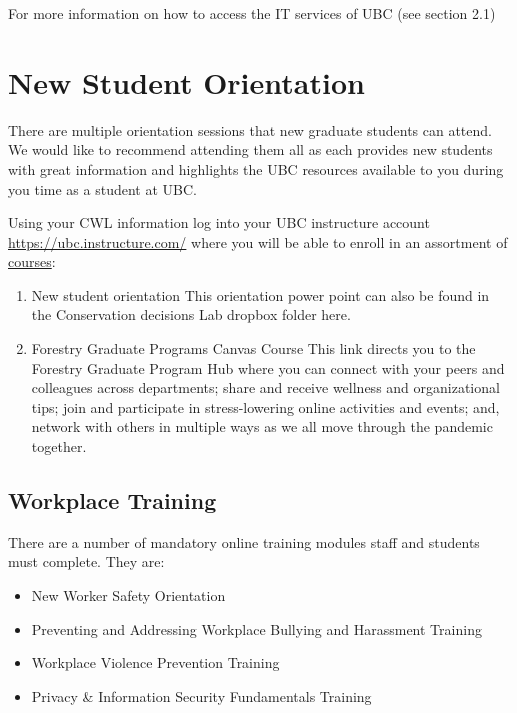 \documentclass[
]{book}
\providecommand{\tightlist}{%
  \setlength{\itemsep}{0pt}\setlength{\parskip}{0pt}}
\begin{document}
For more information on how to access the IT services of UBC (see section 2.1)

\hypertarget{orientation}{%
\chapter*{New Student Orientation}\label{orientation}}

There are multiple orientation sessions that new graduate students can attend. We would like to recommend attending them all as each provides new students with great information and highlights the UBC resources available to you during you time as a student at UBC.

Using your CWL information log into your UBC instructure account \url{https://ubc.instructure.com/} where you will be able to enroll in an assortment of \href{https://wpl.ubc.ca/}{courses}:

\begin{enumerate}
\def\labelenumi{\arabic{enumi})}
\tightlist
\item
  New student orientation This orientation power point can also be found in the Conservation decisions Lab dropbox folder here.
\item
  Forestry Graduate Programs Canvas Course This link directs you to the Forestry Graduate Program Hub where you can connect with your peers and colleagues across departments; share and receive wellness and organizational tips; join and participate in stress-lowering online activities and events; and, network with others in multiple ways as we all move through the pandemic together.
\end{enumerate}

\hypertarget{workplacetraining}{%
\section*{Workplace Training}\label{workplacetraining}}

There are a number of mandatory online training modules staff and students must complete. They are:

\begin{itemize}
\tightlist
\item
  New Worker Safety Orientation
\item
  Preventing and Addressing Workplace Bullying and Harassment Training
\item
  Workplace Violence Prevention Training
\item
  Privacy \& Information Security Fundamentals Training
\end{itemize}
\end{document}
